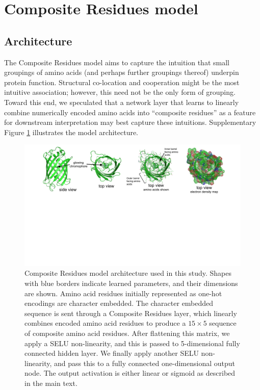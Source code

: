 \section{Composite Residues model} \label{sec:compres}

\subsection{Architecture}
The Composite Residues model aims to capture the intuition that small groupings of amino acids (and perhaps further groupings thereof) underpin protein function. Structural co-location and cooperation might be the most intuitive association; however, this need not be the only form of grouping. Toward this end, we speculated that a network layer that learns to linearly combine numerically encoded amino acids into “composite residues” as a feature for downstream interpretation may best capture these intuitions.  Supplementary Figure \ref{compres} illustrates the model architecture.

\begin{figure}[t!]
  \includegraphics[width=1\linewidth,page=7,trim={5cm 9cm 6cm 0}]{figures/2018-05-09-NIPS_2018_Figures.pdf}
  \caption[Composite Residues model architecture used in this study]{Composite Residues model architecture used in this study. Shapes with blue borders indicate learned parameters, and their dimensions are shown. Amino acid residues initially represented as one-hot encodings are character embedded. The character embedded sequence is sent through a Composite Residues layer, which linearly combines encoded amino acid residues to produce a $15 \times 5$ sequence of composite amino acid residues. After flattening this matrix, we apply a SELU non-linearity, and this is passed to 5-dimensional fully connected hidden layer. We finally apply another SELU non-linearity, and pass this to a fully connected one-dimensional output node. The output activation is either linear or sigmoid as described in the main text.}
  \label{compres}
\end{figure}

